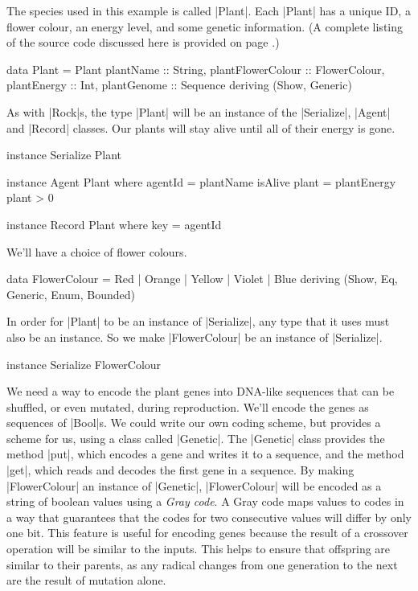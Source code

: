The species used in this example is called |Plant|.
Each |Plant| has a unique ID, a flower colour,
an energy level, and some genetic information.
(A complete listing of the source code discussed here is provided on 
page \pageref{code:plant}.)

\begin{code}
data Plant = Plant
  { 
    plantName :: String,
    plantFlowerColour :: FlowerColour,
    plantEnergy :: Int,
    plantGenome :: Sequence
  } deriving (Show, Generic)
\end{code} 

As with |Rock|s, the type |Plant| will be an instance of 
the |Serialize|, |Agent| and |Record| classes.
Our plants will stay alive until all of their energy is gone.

\begin{code}
instance Serialize Plant

instance Agent Plant where
  agentId = plantName
  isAlive plant = plantEnergy plant > 0

instance Record Plant where key = agentId
\end{code} 

We'll have a choice of flower colours.
\begin{code}
data FlowerColour = Red | Orange | Yellow | Violet | Blue
  deriving (Show, Eq, Generic, Enum, Bounded)
\end{code} 

In order for |Plant| to be an instance of |Serialize|,
any type that it uses must also be an instance.
So we make |FlowerColour| be an instance of |Serialize|.

\begin{code}
instance Serialize FlowerColour
\end{code} 

We need a way to encode the plant genes into DNA-like sequences that can
be shuffled, or even mutated, during reproduction.
We'll encode the genes as sequences of |Bool|s.
We could write our own coding scheme, but 
provides a scheme for us, using a class called |Genetic|.
The |Genetic| class provides the method |put|, which encodes a gene and writes it to a sequence,
and the method |get|, which reads and decodes the first gene in a sequence.
By making |FlowerColour| an instance of |Genetic|, 
|FlowerColour| will be encoded as a string of boolean values using a \emph{Gray code}.
A Gray code maps values to codes in a way that guarantees that the codes
for two consecutive values will differ by only one bit. This feature
is useful for encoding genes because the result
of a crossover operation will be similar to the inputs. 
This helps to
ensure that offspring are similar to their parents, as any radical
changes from one generation to the next are the result of mutation
alone.

